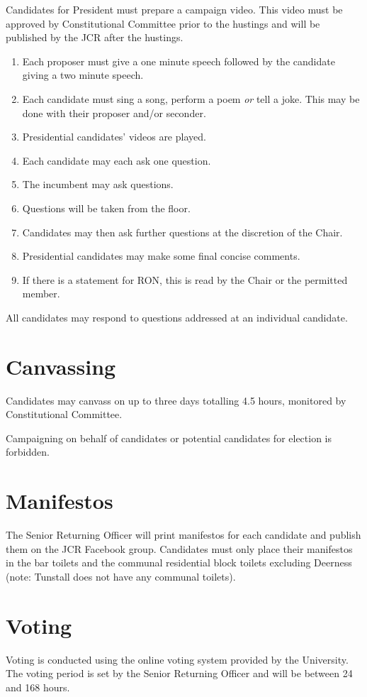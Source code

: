 \documentclass[12pt]{article}
\begin{document}
    Candidates for President must prepare a campaign video. This video must be approved by Constitutional Committee prior to the hustings and will be published by the JCR after the hustings.

    \begin{enumerate}
        \item Each proposer must give a one minute speech followed by the candidate giving a two minute speech.
        \item Each candidate must sing a song, perform a poem \emph{or} tell a joke. This may be done with their proposer and/or seconder.
        \item Presidential candidates' videos are played.
        \item Each candidate may each ask one question.
        \item The incumbent may ask questions.
        \item Questions will be taken from the floor.
        \item Candidates may then ask further questions at the discretion of the Chair.
        \item Presidential candidates may make some final concise comments.
        \item If there is a statement for RON, this is read by the Chair or the permitted member.
    \end{enumerate}

    All candidates may respond to questions addressed at an individual candidate.

    \section{Canvassing}
    Candidates may canvass on up to three days totalling 4.5 hours, monitored by Constitutional Committee.

    Campaigning on behalf of candidates or potential candidates for election is forbidden.

    \section{Manifestos}
    The Senior Returning Officer will print manifestos for each candidate and publish them on the JCR Facebook group. Candidates must only place their manifestos in the bar toilets and the communal residential block toilets excluding Deerness (note: Tunstall does not have any communal toilets).

    \section{Voting}
    Voting is conducted using the online voting system provided by the University.
    The voting period is set by the Senior Returning Officer and will be between 24 and 168 hours.
\end{document}
